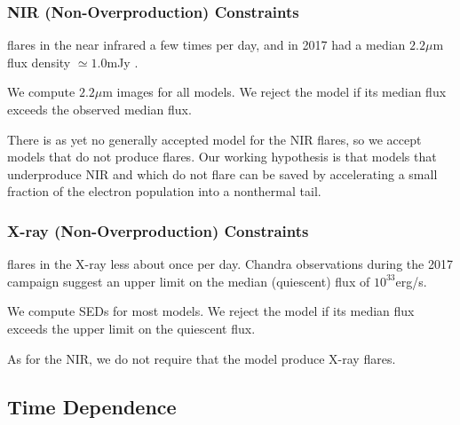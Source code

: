 \subsubsection{NIR (Non-Overproduction) Constraints}

\sgra flares in the near infrared a few times per day, and in 2017 had a median $2.2\mu$m flux density $\simeq 1.0$mJy \citep{2020A&A...638A...2G}.

We compute $2.2\mu$m images for all models.  We reject the model if its median flux exceeds the observed median flux.  

There is as yet no generally accepted model for the NIR flares, so we accept models that do not produce flares. Our working hypothesis is that models that underproduce NIR and which do not flare can be saved by accelerating a small fraction of the electron population into a nonthermal tail.  

\subsubsection{X-ray (Non-Overproduction) Constraints}

\sgra flares in the X-ray less about once per day.  Chandra observations during the 2017 campaign suggest an upper limit on the median (quiescent) flux of $10^{33}$erg/s.  

We compute SEDs for most models.  We reject the model if its median flux exceeds the upper limit on the quiescent flux.

As for the NIR, we do not require that the model produce X-ray flares.  


\subsection{Time Dependence}

